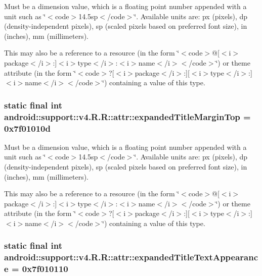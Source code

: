 Must be a dimension value, which is a floating point number appended with a unit such as \char`\"{}$<$code$>$14.5sp$<$/code$>$\char`\"{}. Available units are: px (pixels), dp (density-independent pixels), sp (scaled pixels based on preferred font size), in (inches), mm (millimeters). 

This may also be a reference to a resource (in the form \char`\"{}$<$code$>$@\mbox{[}$<$i$>$package$<$/i$>$:\mbox{]}$<$i$>$type$<$/i$>$:$<$i$>$name$<$/i$>$$<$/code$>$\char`\"{}) or theme attribute (in the form \char`\"{}$<$code$>$?\mbox{[}$<$i$>$package$<$/i$>$:\mbox{]}\mbox{[}$<$i$>$type$<$/i$>$:\mbox{]}$<$i$>$name$<$/i$>$$<$/code$>$\char`\"{}) containing a value of this type. \hypertarget{classandroid_1_1support_1_1v4_1_1_r_1_1attr_fe32f2f15f147e260ef8595fb7a63093}{
\subsubsection[{expandedTitleMarginTop}]{\setlength{\rightskip}{0pt plus 5cm}static final int android::support::v4.R.R::attr::expandedTitleMarginTop = 0x7f01010d}}
\label{classandroid_1_1support_1_1v4_1_1_r_1_1attr_fe32f2f15f147e260ef8595fb7a63093}


Must be a dimension value, which is a floating point number appended with a unit such as \char`\"{}$<$code$>$14.5sp$<$/code$>$\char`\"{}. Available units are: px (pixels), dp (density-independent pixels), sp (scaled pixels based on preferred font size), in (inches), mm (millimeters). 

This may also be a reference to a resource (in the form \char`\"{}$<$code$>$@\mbox{[}$<$i$>$package$<$/i$>$:\mbox{]}$<$i$>$type$<$/i$>$:$<$i$>$name$<$/i$>$$<$/code$>$\char`\"{}) or theme attribute (in the form \char`\"{}$<$code$>$?\mbox{[}$<$i$>$package$<$/i$>$:\mbox{]}\mbox{[}$<$i$>$type$<$/i$>$:\mbox{]}$<$i$>$name$<$/i$>$$<$/code$>$\char`\"{}) containing a value of this type. \hypertarget{classandroid_1_1support_1_1v4_1_1_r_1_1attr_e526c5fb60b4d2c1d4b85bbf7e57167a}{
\subsubsection[{expandedTitleTextAppearance}]{\setlength{\rightskip}{0pt plus 5cm}static final int android::support::v4.R.R::attr::expandedTitleTextAppearance = 0x7f010110}}
\label{classandroid_1_1support_1_1v4_1_1_r_1_1attr_e526c5fb60b4d2c1d4b85bbf7e57167a}


